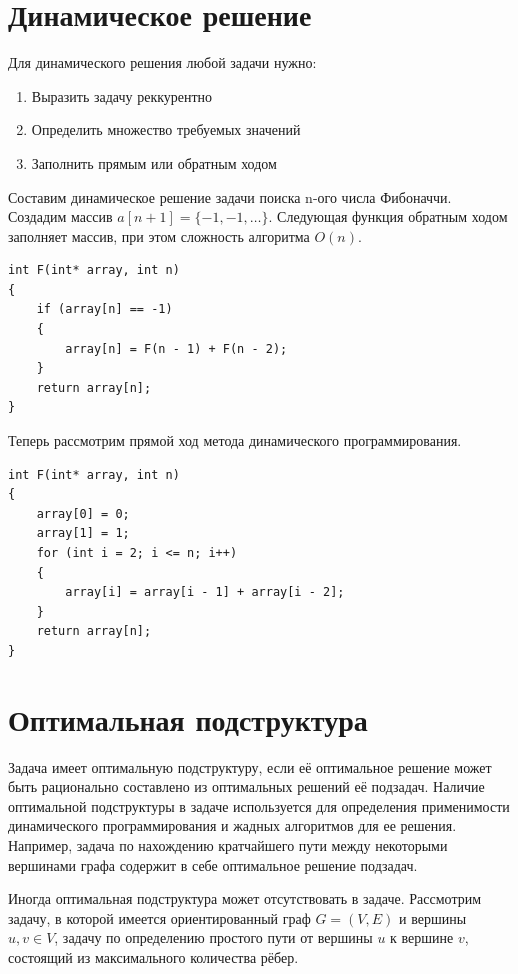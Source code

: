 \documentclass[a4paper,12pt] {report} 			%
\begin{document}
\section{Динамическое решение}

Для динамического решения любой задачи нужно:

\begin{enumerate}
	\item Выразить задачу реккурентно
	\item Определить множество требуемых значений
	\item Заполнить прямым или обратным ходом
\end{enumerate}

Составим динамическое решение задачи поиска n-ого числа Фибоначчи. Создадим массив $a[n + 1] = \{-1, -1, \ldots \}$. Следующая функция обратным ходом заполняет массив, при этом сложность алгоритма $O(n)$.

\lstset{language = C++}
\begin{lstlisting}
int F(int* array, int n)
{
	if (array[n] == -1)
	{
		array[n] = F(n - 1) + F(n - 2);
	}
	return array[n];
}
\end{lstlisting}

Теперь рассмотрим прямой ход метода динамического программирования.

\lstset{language = C++}
\begin{lstlisting}
int F(int* array, int n)
{
	array[0] = 0;
	array[1] = 1;
	for (int i = 2; i <= n; i++)
	{
		array[i] = array[i - 1] + array[i - 2];
	}
	return array[n];
}
\end{lstlisting}

\section{Оптимальная подструктура}

Задача имеет оптимальную подструктуру, если её оптимальное решение может быть рационально составлено из оптимальных решений её подзадач. Наличие оптимальной подструктуры в задаче используется для определения применимости динамического программирования и жадных алгоритмов для ее решения. Например, задача по нахождению кратчайшего пути между некоторыми вершинами графа содержит в себе оптимальное решение подзадач.

Иногда оптимальная подструктура может отсутствовать в задаче. Рассмотрим задачу, в которой имеется ориентированный граф $G=(V,E)$ и вершины $u,v \in V$, задачу по определению простого пути от вершины $u$ к вершине $v$, состоящий из максимального количества рёбер.
\end{document}
